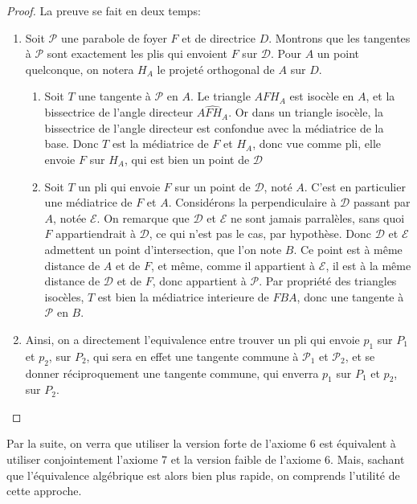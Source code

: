 \documentclass[a4paper,12pt,french]{report}
\begin{document}
			\begin{proof}
				La preuve se fait en deux temps:
				\begin{enumerate}
					\item Soit $\mathcal{P}$  une parabole de foyer $F$ et de directrice $D$. Montrons que les tangentes à $\mathcal{P}$ sont exactement les plis qui envoient $F$ sur $\mathcal{D}$. Pour $A$ un point quelconque, on notera $H_{A}$ le projeté orthogonal de $A$ sur $D$.
					\begin{enumerate}
						\item Soit $T$ une tangente à $\mathcal{P}$ en $A$. Le triangle $AFH_{A}$ est isocèle en $A$, et la bissectrice de l'angle directeur $\widehat{AFH_{A}}$. Or dans un triangle isocèle, la bissectrice de l'angle directeur est confondue avec la médiatrice de la base. Donc $T$ est la médiatrice de $F$ et $H_{A}$, donc vue comme pli, elle envoie $F$ sur $H_{A}$, qui est bien un point de $\mathcal{D}$
						
						\item Soit $T$ un pli qui envoie $F$ sur un point de $\mathcal{D}$, noté $A$. C'est en particulier une médiatrice de $F$ et $A$. Considérons la perpendiculaire à $\mathcal{D}$ passant par $A$, notée $\mathcal{E}$. On remarque que $\mathcal{D}$ et $\mathcal{E}$ ne sont jamais parralèles, sans quoi $F$ appartiendrait à $\mathcal{D}$, ce qui n'est pas le cas, par hypothèse. Donc $\mathcal{D}$ et $\mathcal{E}$ admettent un point d'intersection, que l'on note $B$. Ce point est à même distance de $A$ et de $F$, et même, comme il appartient à $\mathcal{E}$, il est à la même distance de $\mathcal{D}$ et de $F$, donc appartient à $\mathcal{P}$. Par propriété des triangles isocèles, $T$ est bien la médiatrice interieure de $FBA$, donc une tangente à $\mathcal{P}$ en $B$.
					\end{enumerate}
					
					\item Ainsi, on a directement l'equivalence entre trouver un pli qui envoie $p_{1}$ sur $P_{1}$ et $p_{2}$, sur $P_{2}$, qui sera en effet une tangente commune à $\mathcal{P}_{1}$ et $\mathcal{P}_{2}$, et se donner réciproquement une tangente commune, qui enverra $p_{1}$ sur $P_{1}$ et $p_{2}$, sur $P_{2}$.
				\end{enumerate}
			\end{proof}
		Par la suite, on verra que utiliser la version forte de l'axiome 6 est équivalent à utiliser conjointement l'axiome 7 et la version faible de l'axiome 6. Mais, sachant que l'équivalence algébrique est alors bien plus rapide, on comprends l'utilité de cette approche.
	
\end{document}
